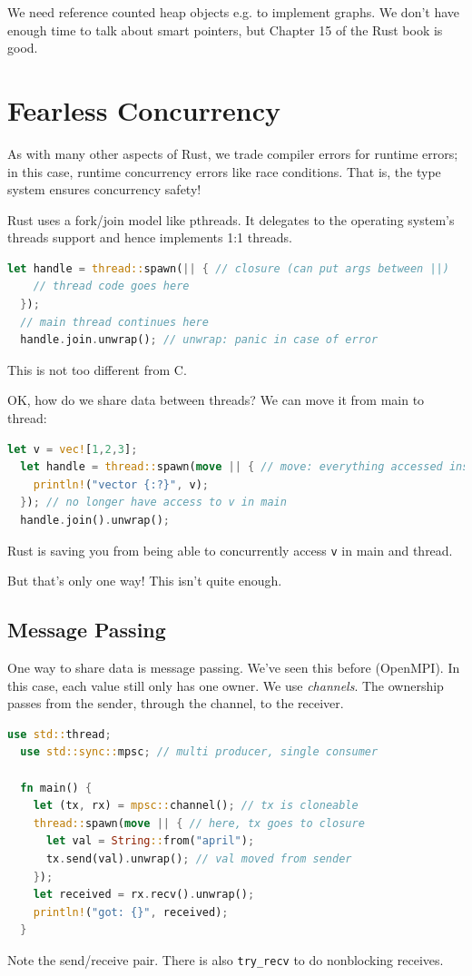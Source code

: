 \documentclass[a4paper]{report}
\newcommand{\CPP}{C\nolinebreak\hspace{-.05em}\raisebox{.4ex}{\tiny\bf +}\nolinebreak\hspace{-.10em}\raisebox{.4ex}{\tiny\bf +}}
\def\CPP{{C\nolinebreak[4]\hspace{-.05em}\raisebox{.4ex}{\tiny\bf ++}}}
\begin{document}
We need reference counted heap objects e.g. to implement graphs. We don't have
enough time to talk about smart pointers, but Chapter 15 of the Rust book is good.

\section*{Fearless Concurrency}
As with many other aspects of Rust, we trade compiler errors for runtime
errors; in this case, runtime concurrency errors like race conditions.
That is, the type system ensures concurrency safety!

Rust uses a fork/join model like pthreads. It delegates to the operating
system's threads support and hence implements 1:1 threads.
\begin{lstlisting}[language=Rust]
  let handle = thread::spawn(|| { // closure (can put args between ||)
    // thread code goes here
  });
  // main thread continues here
  handle.join.unwrap(); // unwrap: panic in case of error
\end{lstlisting}
This is not too different from \CPP.

OK, how do we share data between threads? We can move it from main to thread:
\begin{lstlisting}[language=Rust]
  let v = vec![1,2,3];
  let handle = thread::spawn(move || { // move: everything accessed inside closure is moved
    println!("vector {:?}", v);
  }); // no longer have access to v in main
  handle.join().unwrap();
\end{lstlisting}
Rust is saving you from being able to concurrently access {\tt v} in main and thread.

But that's only one way! This isn't quite enough.

\subsection*{Message Passing}
One way to share data is message passing. We've seen this before (OpenMPI).
In this case, each value still only has one owner. We use \emph{channels}. The ownership passes
from the sender, through the channel, to the receiver.
\begin{lstlisting}[language=Rust]
  use std::thread;
  use std::sync::mpsc; // multi producer, single consumer

  fn main() {
    let (tx, rx) = mpsc::channel(); // tx is cloneable
    thread::spawn(move || { // here, tx goes to closure
      let val = String::from("april");
      tx.send(val).unwrap(); // val moved from sender
    });
    let received = rx.recv().unwrap();
    println!("got: {}", received);
  }
\end{lstlisting}
Note the send/receive pair. There is also {\tt try\_recv} to do nonblocking receives.
\end{document}
